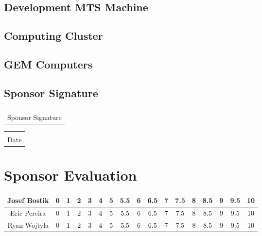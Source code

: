 \documentclass[12pt]{article}
\makeatletter
\newcommand{\titledate}[2][2.5in]{%
	\noindent%
	\begin{tabular}{@{}p{#1}@{}}
		\\ \hline \\[-.75\normalbaselineskip]
		#2
	\end{tabular} \hspace{1in}
	\begin{tabular}{@{}p{#1}@{}}
		\\ \hline \\[-.75\normalbaselineskip]
		Date
	\end{tabular}
}
\makeatother
\begin{document}
\subsection{Development MTS Machine}

\vspace{1in}

\subsection{Computing Cluster}

\vspace{1in}

\subsection{GEM Computers}

\vspace{1in}


\subsection{Sponsor Signature}
\vspace{.5in}
 \titledate{Sponsor Signature}
 
\section{Sponsor Evaluation}
\begin{tabular}{|c|c|c|c|c|c|c|c|c|c|c|c|c|c|c|c|c|}
	\hline
	Josef Bostik & 0 & 1 & 2 & 3 & 4 & 5 & 5.5 & 6 & 6.5 & 7 & 7.5 & 8 & 8.5 & 9 & 9.5 & 10\\
	\hline
	Eric Pereira & 0 & 1 & 2 & 3 & 4 & 5 & 5.5 & 6 & 6.5 & 7 & 7.5 & 8 & 8.5 & 9 & 9.5 & 10\\
	\hline
	Ryan Wojtyla & 0 & 1 & 2 & 3 & 4 & 5 & 5.5 & 6 & 6.5 & 7 & 7.5 & 8 & 8.5 & 9 & 9.5 & 10\\
	\hline
\end{tabular}
\end{document}
